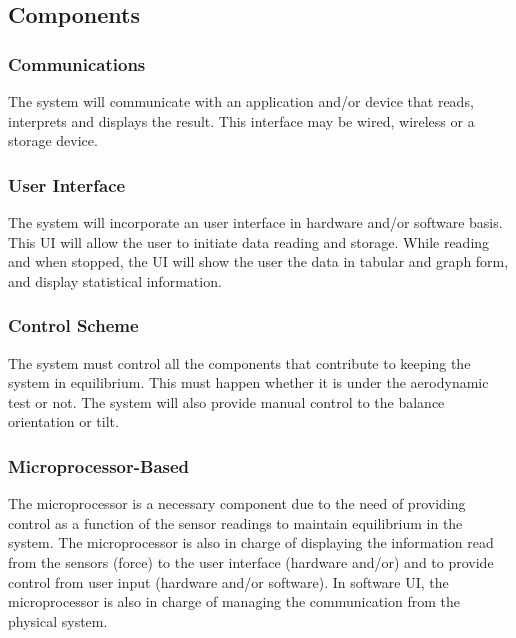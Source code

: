	\subsection{Components}
		\subsubsection{Communications}
			The system will communicate with an application and/or device that reads, interprets and displays the result. This interface may be wired, wireless or a storage device.

		\subsubsection{User Interface}
			The system will incorporate an user interface in hardware and/or software basis. This UI will allow the user to initiate data reading and storage. While reading and when stopped,
			the UI will show the user the data in tabular and graph form, and display statistical
			information.

		\subsubsection{Control Scheme}
			The system must control all the components that contribute to keeping the system in
			equilibrium. This must happen whether it is under the aerodynamic test or not. The
			system will also provide manual control to the balance orientation or tilt.

		\subsubsection{Microprocessor-Based}
			The microprocessor is a necessary component due to the need of providing control as a function of the sensor readings to maintain equilibrium in the system. The microprocessor is also in charge of displaying the information read from the sensors (force) to the user interface (hardware and/or) and to provide control from user input (hardware and/or software). In software UI, the microprocessor is also in charge of managing the communication from the physical system.
